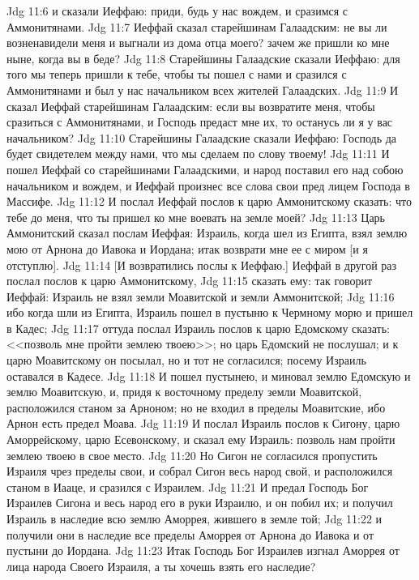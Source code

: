 \vs Jdg 11:6 и сказали Иеффаю: приди, будь у нас вождем, и сразимся с Аммонитянами.
\vs Jdg 11:7 Иеффай сказал старейшинам Галаадским: не вы ли возненавидели меня и выгнали из дома отца моего? зачем же пришли ко мне ныне, когда вы в беде?
\vs Jdg 11:8 Старейшины Галаадские сказали Иеффаю: для того мы теперь пришли к тебе, чтобы ты пошел с нами и сразился с Аммонитянами и был у нас начальником всех жителей Галаадских.
\vs Jdg 11:9 И сказал Иеффай старейшинам Галаадским: если вы возвратите меня, чтобы сразиться с Аммонитянами, и Господь предаст мне их, то останусь ли я у вас начальником?
\vs Jdg 11:10 Старейшины Галаадские сказали Иеффаю: Господь да будет свидетелем между нами, что мы сделаем по слову твоему!
\vs Jdg 11:11 И пошел Иеффай со старейшинами Галаадскими, и народ поставил его над собою начальником и вождем, и Иеффай произнес все слова свои пред лицем Господа в Массифе.
\vs Jdg 11:12 И послал Иеффай послов к царю Аммонитскому сказать: что тебе до меня, что ты пришел ко мне воевать на земле моей?
\vs Jdg 11:13 Царь Аммонитский сказал послам Иеффая: Израиль, когда шел из Египта, взял землю мою от Арнона до Иавока и Иордана; итак возврати мне ее с миром [и я отступлю].
\vs Jdg 11:14 [И возвратились послы к Иеффаю.] Иеффай в другой раз послал послов к царю Аммонитскому,
\vs Jdg 11:15 сказать ему: так говорит Иеффай: Израиль не взял земли Моавитской и земли Аммонитской;
\vs Jdg 11:16 ибо когда шли из Египта, Израиль пошел в пустыню к Чермному морю и пришел в Кадес;
\vs Jdg 11:17 оттуда послал Израиль послов к царю Едомскому сказать: <<позволь мне пройти землею твоею>>; но царь Едомский не послушал; и к царю Моавитскому он посылал, но и тот не согласился; посему Израиль оставался в Кадесе.
\vs Jdg 11:18 И пошел пустынею, и миновал землю Едомскую и землю Моавитскую, и, придя к восточному пределу земли Моавитской, расположился станом за Арноном; но не входил в пределы Моавитские, ибо Арнон есть предел Моава.
\vs Jdg 11:19 И послал Израиль послов к Сигону, царю Аморрейскому, царю Есевонскому, и сказал ему Израиль: позволь нам пройти землею твоею в свое место.
\vs Jdg 11:20 Но Сигон не согласился пропустить Израиля чрез пределы свои, и собрал Сигон весь народ свой, и расположился станом в Иааце, и сразился с Израилем.
\vs Jdg 11:21 И предал Господь Бог Израилев Сигона и весь народ его в руки Израилю, и он побил их; и получил Израиль в наследие всю землю Аморрея, жившего в земле той;
\vs Jdg 11:22 и получили они в наследие все пределы Аморрея от Арнона до Иавока и от пустыни до Иордана.
\vs Jdg 11:23 Итак Господь Бог Израилев изгнал Аморрея от лица народа Своего Израиля, а ты хочешь взять его наследие?
